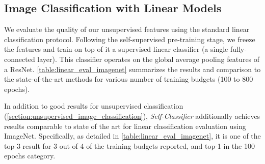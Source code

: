 \documentclass[runningheads]{llncs}
\begin{document}
\subsection{Image Classification with Linear Models}
\label{section:linear_classification}
We evaluate the quality of our unsupervised features using the standard linear classification protocol. Following the self-supervised pre-training stage, we freeze the features and train on top of it a supervised linear classifier (a single fully-connected layer). This classifier operates on the global average pooling features of a ResNet. \cref{table:linear_eval_imagenet} summarizes the results and comparison to the state-of-the-art methods for various number of training budgets (100 to 800 epochs).

In addition to good results for unsupervised classification (\cref{section:unsupervised_image_classification}), \textit{Self-Classifier} additionally achieves results comparable to state of the art for linear classification evaluation using ImageNet. Specifically, as detailed in \cref{table:linear_eval_imagenet}, it is one of the top-3 result for 3 out of 4 of the training budgets reported, and top-1 in the 100 epochs category.
\end{document}
